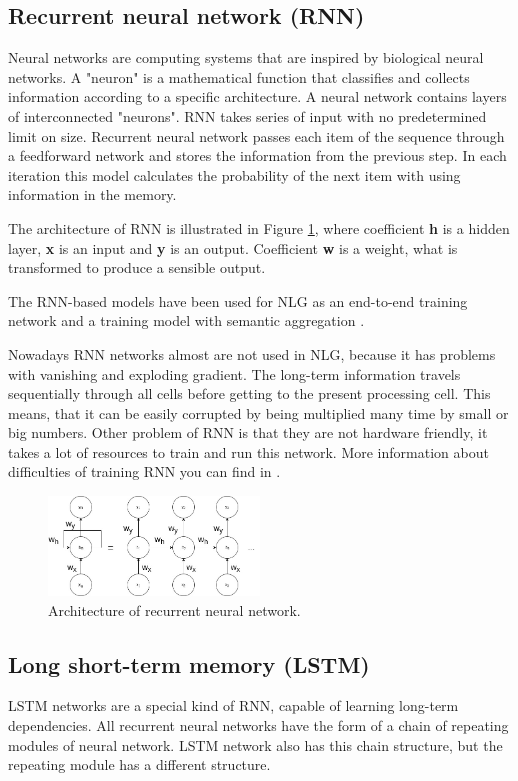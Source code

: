 \subsection{Recurrent neural network (RNN)}
Neural networks are computing systems that are inspired by biological neural networks. A "neuron" is a mathematical function that classifies and collects information according to a specific architecture. A neural network contains layers of interconnected "neurons". RNN takes series of input with no predetermined limit on size. Recurrent neural network passes each item of the sequence through a feedforward network and stores the information from the previous step. In each iteration this model calculates the probability of the next item with using information in the memory.

The architecture of RNN is illustrated in Figure \ref{rnn}, where coefficient \textbf{h} is a hidden layer, \textbf{x} is an input and \textbf{y} is an output. Coefficient \textbf{w} is a weight, what is transformed to produce a sensible output.

The RNN-based models have been used for NLG as an end-to-end training network \cite{network_nlg} and a training model with semantic aggregation \cite{rnn_nlg}. 

Nowadays RNN networks almost are not used in NLG, because it has problems with vanishing and exploding gradient. The long-term information travels sequentially  through all cells before getting to the present processing cell. This means, that it can be easily corrupted by being multiplied many time by small or big numbers. Other problem of RNN is that they are not hardware friendly, it takes a lot of resources to train and run this network. More information about difficulties of training RNN you can find in \cite{rnn_difficulties}.

\begin{figure}[hbt]
  \centering
  \includegraphics[width=0.5\textwidth]{figures/rnn.jpg}
  \caption{Architecture of recurrent neural network.}
  \label{rnn}
\end{figure}


\subsection{Long short-term memory (LSTM)} 
LSTM networks are a special kind of RNN, capable of learning long-term dependencies. All recurrent neural networks have the form of a chain of repeating modules of neural network. LSTM network also has this chain structure, but the repeating module has a different structure. 

